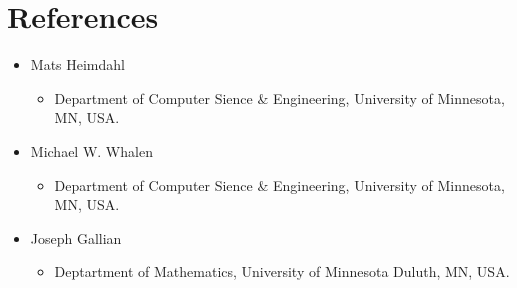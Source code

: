 \documentclass[11pt,a4paper,sans]{moderncv}        %
\begin{document}
\section{References}
\begin{itemize}


\item Mats Heimdahl
    \begin{itemize}
    \item Department of Computer Sience \& Engineering, University of Minnesota, MN, USA.

    \end{itemize}
    
    \item Michael W. Whalen
    \begin{itemize}
    \item Department of Computer Sience \& Engineering, University of Minnesota, MN, USA.

    \end{itemize}

\item Joseph Gallian
    \begin{itemize}
    \item Deptartment of Mathematics, University of Minnesota Duluth, MN, USA.

    \end{itemize}
\end{itemize}

%

\end{document}
